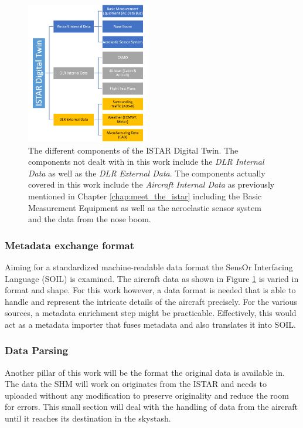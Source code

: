 \begin{figure}[h]
    \centering
    \includegraphics[width=0.48\textwidth]{03_figures/DIGECAT}
    \caption[Components of the Digital Twin]{The different components of the ISTAR Digital Twin. The components not dealt with in this work include the \textit{DLR Internal Data} as well as the \textit{DLR External Data}. The components actually covered in this work include the \textit{Aircraft Internal Data} as previously mentioned in Chapter \ref{chap:meet_the_istar} including the Basic Measurement Equipment as well as the aeroelastic sensor system and the data from the nose boom. \cite{arts_digital_2022}}
    \label{fig:digecat_data_sources}
\end{figure}

\subsubsection{Metadata exchange format}
\label{chap:2-metadata-format}

Aiming for a standardized machine-readable data format the SensOr Interfacing Language (SOIL) is examined. The aircraft data as shown in Figure \ref{fig:digecat_data_sources} is varied in format and shape. For this work however, a data format is needed that is able to handle and represent the intricate details of the aircraft precisely. For the various sources, a metadata enrichment step might be practicable. Effectively, this would act as a metadata importer that fuses metadata and also translates it into SOIL.


\subsubsection{Data Parsing}
Another pillar of this work will be the format the original data is available in. The data the SHM will work on originates from the ISTAR and needs to uploaded without any modification to preserve originality and reduce the room for errors. This small section will deal with the handling of data from the aircraft until it reaches its destination in the skystash.

